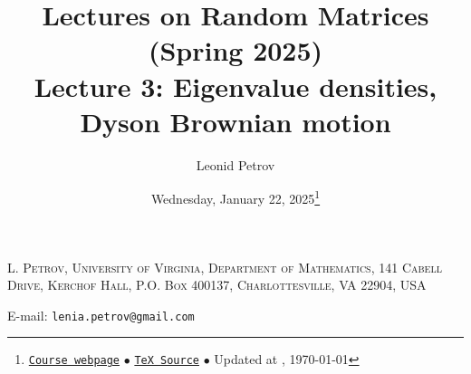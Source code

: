 \documentclass[letterpaper,11pt,oneside,reqno]{article}
\numberwithin{equation}{section}
\theoremstyle{definition}
\begin{document}
\title{Lectures on Random Matrices
(Spring 2025)
\\Lecture 3: Eigenvalue densities, Dyson Brownian motion}


\date{Wednesday, January 22, 2025\footnote{\href{https://lpetrov.cc/rmt25/}{\texttt{Course webpage}}
$\bullet$ \href{https://lpetrov.cc/rmt25/rmt25-notes/rmt2025-l01.tex}{\texttt{TeX Source}}
$\bullet$
Updated at \currenttime, \today}}



\author{Leonid Petrov}


\maketitle














































\medskip

\textsc{L. Petrov, University of Virginia, Department of Mathematics, 141 Cabell Drive, Kerchof Hall, P.O. Box 400137, Charlottesville, VA 22904, USA}

E-mail: \texttt{lenia.petrov@gmail.com}
\end{document}
